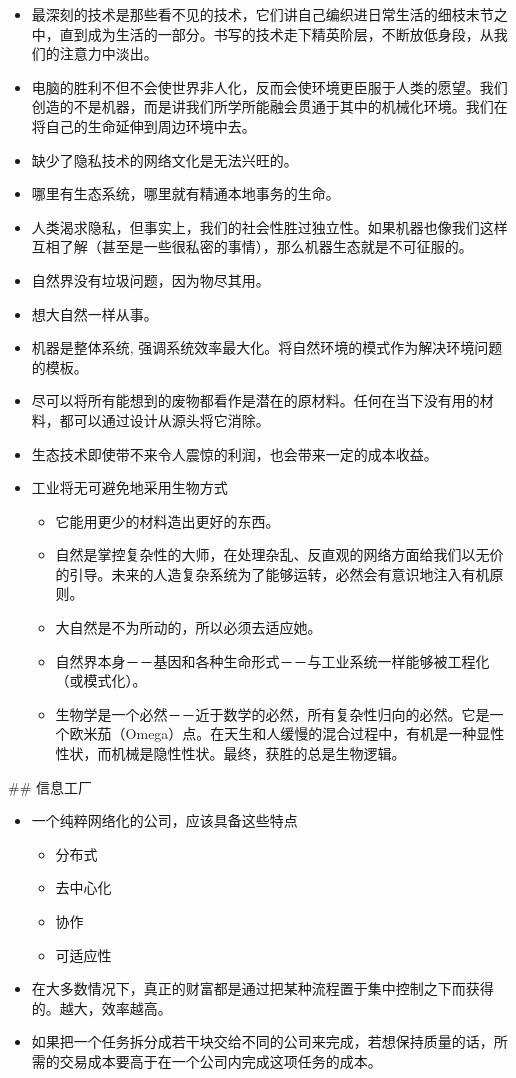 \documentclass[11pt]{article}
\begin{document}
\begin{itemize}
\item 最深刻的技术是那些看不见的技术，它们讲自己编织进日常生活的细枝末节之中，直到成为生活的一部分。书写的技术走下精英阶层，不断放低身段，从我们的注意力中淡出。
\item 电脑的胜利不但不会使世界非人化，反而会使环境更臣服于人类的愿望。我们创造的不是机器，而是讲我们所学所能融会贯通于其中的机械化环境。我们在将自己的生命延伸到周边环境中去。
\item 缺少了隐私技术的网络文化是无法兴旺的。
\item 哪里有生态系统，哪里就有精通本地事务的生命。
\item 人类渴求隐私，但事实上，我们的社会性胜过独立性。如果机器也像我们这样互相了解（甚至是一些很私密的事情），那么机器生态就是不可征服的。
\item 自然界没有垃圾问题，因为物尽其用。
\item 想大自然一样从事。
\item 机器是整体系统, 强调系统效率最大化。将自然环境的模式作为解决环境问题的模板。
\item 尽可以将所有能想到的废物都看作是潜在的原材料。任何在当下没有用的材料，都可以通过设计从源头将它消除。
\item 生态技术即使带不来令人震惊的利润，也会带来一定的成本收益。
\item 工业将无可避免地采用生物方式
\begin{itemize}
\item 它能用更少的材料造出更好的东西。
\item 自然是掌控复杂性的大师，在处理杂乱、反直观的网络方面给我们以无价的引导。未来的人造复杂系统为了能够运转，必然会有意识地注入有机原则。
\item 大自然是不为所动的，所以必须去适应她。
\item 自然界本身－－基因和各种生命形式－－与工业系统一样能够被工程化（或模式化）。
\item 生物学是一个必然－－近于数学的必然，所有复杂性归向的必然。它是一个欧米茄（Omega）点。在天生和人缓慢的混合过程中，有机是一种显性性状，而机械是隐性性状。最终，获胜的总是生物逻辑。
\end{itemize}
\end{itemize}

\#\# 信息工厂
\begin{itemize}
\item 一个纯粹网络化的公司，应该具备这些特点
\begin{itemize}
\item 分布式
\item 去中心化
\item 协作
\item 可适应性
\end{itemize}
\item 在大多数情况下，真正的财富都是通过把某种流程置于集中控制之下而获得的。越大，效率越高。
\item 如果把一个任务拆分成若干块交给不同的公司来完成，若想保持质量的话，所需的交易成本要高于在一个公司内完成这项任务的成本。
\end{itemize}
\end{document}
